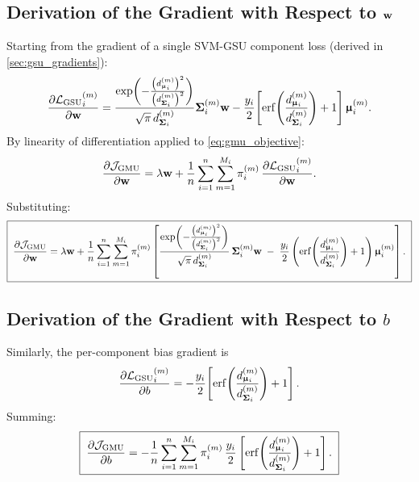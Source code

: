 \documentclass[11pt, letterpaper]{article}
\newcommand{\bSigma}{\vb{\Sigma}}
\newcommand{\bmu}{\boldsymbol{\upmu}}
\newcommand{\loss}{\mathcal{L}}
\newcommand{\obj}{\mathcal{J}}
\begin{document}
\subsection{Derivation of the Gradient with Respect to $\vb{w}$}

Starting from the gradient of a single SVM-GSU component loss (derived in \cref{sec:gsu_gradients}):
\begin{equation}
    \pdv{{\loss_{\text{GSU}}}_{i}^{(m)}}{\vb{w}} = \frac{\exp\!\left(-\frac{\left(d_{\bmu_i}^{(m)}\right)^2}{\left(d_{\bSigma_i}^{(m)}\right)^2}\right)}{\sqrt{\pi}\, d_{\bSigma_i}^{(m)}}\bSigma_i^{(m)}\vb{w} - \frac{y_i}{2}\!\left[\mathrm{erf}\!\left(\frac{d_{\bmu_i}^{(m)}}{d_{\bSigma_i}^{(m)}}\right) + 1\right]\bmu_i^{(m)}.
\end{equation}
By linearity of differentiation applied to \cref{eq:gmu_objective}:
\begin{equation}
    \pdv{\obj_{\text{GMU}}}{\vb{w}} = \lambda\vb{w} + \frac{1}{n}\sum_{i=1}^{n}\sum_{m=1}^{M_i}\pi_i^{(m)}\,\pdv{{\loss_{\text{GSU}}}_{i}^{(m)}}{\vb{w}}.
\end{equation}
Substituting:
\begin{equation}\label{eq:gmu_grad_w}
    \boxed{\;\pdv{\obj_{\text{GMU}}}{\vb{w}} = \lambda \vb{w}
    + \frac{1}{n}\sum_{i=1}^{n}\sum_{m=1}^{M_i} \pi_i^{(m)} \left[\frac{\exp\!\left(-\frac{\left(d_{\bmu_i}^{(m)}\right)^2}{\left(d_{\bSigma_i}^{(m)}\right)^2}\right)}{\sqrt{\pi}\, d_{\bSigma_i}^{(m)}}\, \bSigma_i^{(m)} \vb{w} \;-\; \frac{y_i}{2}\left(\mathrm{erf}\!\left(\frac{d_{\bmu_i}^{(m)}}{d_{\bSigma_i}^{(m)}}\right) + 1\right) \bmu_i^{(m)}\right].\;}
\end{equation}

\subsection{Derivation of the Gradient with Respect to $b$}

Similarly, the per-component bias gradient is
\begin{equation}
    \pdv{{\loss_{\text{GSU}}}_{i}^{(m)}}{b} = -\frac{y_i}{2}\!\left[\mathrm{erf}\!\left(\frac{d_{\bmu_i}^{(m)}}{d_{\bSigma_i}^{(m)}}\right) + 1\right].
\end{equation}
Summing:
\begin{equation}\label{eq:gmu_grad_b}
    \boxed{\;\pdv{\obj_{\text{GMU}}}{b} = -\frac{1}{n}\sum_{i=1}^{n}\sum_{m=1}^{M_i} \pi_i^{(m)}\, \frac{y_i}{2}\left[\mathrm{erf}\!\left(\frac{d_{\bmu_i}^{(m)}}{d_{\bSigma_i}^{(m)}}\right) + 1\right].\;}
\end{equation}
\end{document}
